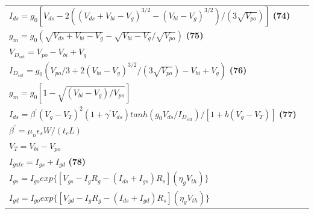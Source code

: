 \documentclass[10pt,landscape]{article}
\begin{document}
\begin{multicols}{3}
\begin{tabular}{@{}ll@{}}
$ I_{ds}=g_0[V_{ds}-2((V_{ds}+V_{bi}-V_g)^{3/2}-(V_{bi}-V_g)^{3/2})/(3\sqrt{V_{po}})]$ \textbf{(74)} \\
$ g_m=g_0(\sqrt{V_{ds}+V_{bi}-V_g}-\sqrt{V_{bi}-V_g}/\sqrt{V_{po}})$ \textbf{(75)} \\
$ V_{D_{sat}}=V_{po}-V_{bi}+V_g$ \\
$ I_{D_{sat}}=g_0(V_{po}/3+2(V_{bi}-V_g)^{3/2}/(3\sqrt{V_{po}})-V_{bi}+V_g)$ \textbf{(76)} \\
$ g_m=g_0[1-\sqrt{(V_{bi}-V_g)/V_{po}}]$ \\
$ I_{ds}=\beta^{\prime}(V_g-V_T)^2(1+\gamma^{\prime}V_{ds})tanh(g_0V_{ds}/I_{D_{sat}})/[1+b(V_g-V_T)]$ \textbf{(77)} \\
$ \beta^{\prime}=\mu_n\epsilon_sW/(t_cL)$ \\
$ V_T=V_{bi}-V_{po}$ \\
$ I_{gate}=I_{gs}+I_{gd}$ \textbf{(78)} \\
$ I_{gs}=I_{go}exp\{[V_{gs}-I_gR_g-(I_{ds}+I_{gs})R_s](\eta_gV_{th})\}$ \\
$ I_{gd}=I_{go}exp\{[V_{gd}-I_gR_g-(I_{ds}+I_{gd})R_s](\eta_gV_{th})\}$ \\
\end{tabular}



\end{multicols}
\end{document}
